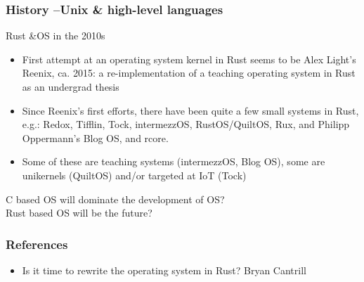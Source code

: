 \begin{frame}[plain]
	\frametitle{History --Unix \& high-level languages}
	
	Rust \&OS in the 2010s
	
	\begin{itemize}
		
		\item  First attempt at an operating system kernel in Rust seems to be
		Alex Light’s Reenix, ca. 2015: a re-implementation of a teaching
		operating system in Rust as an undergrad thesis
		
		
		\item  Since Reenix’s first efforts, there have been quite a few small
		systems in Rust, e.g.: Redox, Tifflin, Tock, intermezzOS,
		RustOS/QuiltOS, Rux, and Philipp Oppermann’s Blog OS, and rcore.
		
		\item Some of these are teaching systems (intermezzOS, Blog OS),
		some are unikernels (QuiltOS) and/or targeted at IoT (Tock)
		
		
	\end{itemize}
	\LARGE
	C based OS will dominate the development of OS?  \\
	Rust based OS will be the future?
\end{frame}

\begin{frame}[plain]
	\frametitle{References}

	\begin{itemize}
		
		\item Is it time to rewrite the operating system in Rust? Bryan Cantrill
		
		
		
		
	\end{itemize}
	
	
\end{frame}

